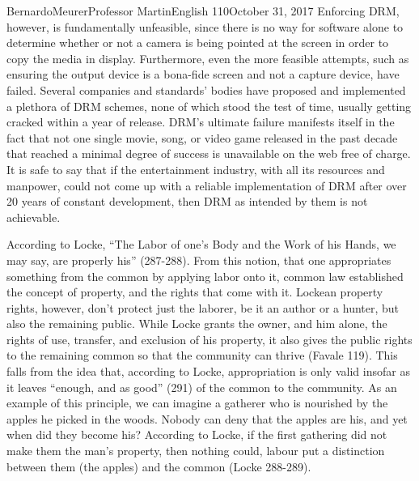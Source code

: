 \documentclass[12pt,letterpaper]{article}
\begin{document}
\begin{mla}{Bernardo}{Meurer}{Professor Martin}{English 110}{October 31, 2017}
    Enforcing DRM, however, is fundamentally unfeasible, since there is no way for software alone to determine whether or not a camera is being pointed at the screen in order to copy the media in display. Furthermore, even the more feasible attempts, such as ensuring the output device is a bona-fide screen and not a capture device, have failed. Several companies and standards' bodies have proposed and implemented a plethora of DRM schemes, none of which stood the test of time, usually getting cracked within a year of release. DRM's ultimate failure manifests itself in the fact that not one single movie, song, or video game released in the past decade that reached a minimal degree of success is unavailable on the web free of charge. It is safe to say that if the entertainment industry, with all its resources and manpower, could not come up with a reliable implementation of DRM after over 20 years of constant development, then DRM as intended by them is not achievable.

    According to Locke, ``The Labor of one's Body and the Work of his Hands, we may say, are properly his'' (287-288). From this notion, that one appropriates something from the common by applying labor onto it, common law established the concept of property, and the rights that come with it. Lockean property rights, however, don't protect just the laborer, be it an author or a hunter, but also the remaining public. While Locke grants the owner, and him alone, the rights of use, transfer, and exclusion of his property, it also gives the public rights to the remaining common so that the community can thrive (Favale 119). This falls from the idea that, according to Locke, appropriation is only valid insofar as it leaves ``enough, and as good'' (291) of the common to the community. As an example of this principle, we can imagine a gatherer who is nourished by the apples he picked in the woods. Nobody can deny that the apples are his, and yet when did they become his? According to Locke, if the first gathering did not make them the man's property, then nothing could, labour put a distinction between them (the apples) and the common (Locke 288-289).
    

\end{mla}
\end{document}
